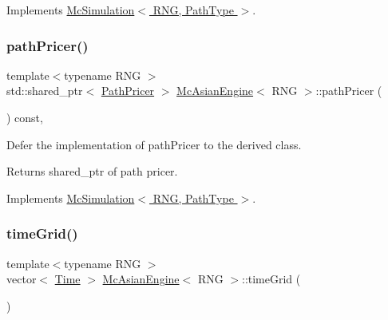 Implements \hyperlink{class_mc_simulation_afa7ba8d9b534837e7c62f47c6d20a353}{Mc\+Simulation$<$ R\+N\+G, Path\+Type $>$}.

\hypertarget{class_mc_asian_engine_a4ad8ccd05433f0668d751a8b3dcbb746}{}\label{class_mc_asian_engine_a4ad8ccd05433f0668d751a8b3dcbb746} 
\subsubsection{\texorpdfstring{path\+Pricer()}{pathPricer()}}
{\footnotesize\ttfamily template$<$typename R\+NG $>$ \\
std\+::shared\+\_\+ptr$<$ \hyperlink{class_path_pricer}{Path\+Pricer} $>$ \hyperlink{class_mc_asian_engine}{Mc\+Asian\+Engine}$<$ R\+NG $>$\+::path\+Pricer (\begin{DoxyParamCaption}{ }\end{DoxyParamCaption}) const\hspace{0.3cm}{\ttfamily [override]}, {\ttfamily [virtual]}}



Defer the implementation of path\+Pricer to the derived class. 

\begin{DoxyReturn}{Returns}
shared\+\_\+ptr of path pricer. 
\end{DoxyReturn}


Implements \hyperlink{class_mc_simulation_a64a3e635c1fa9d25797dc0cbad767238}{Mc\+Simulation$<$ R\+N\+G, Path\+Type $>$}.

\hypertarget{class_mc_asian_engine_ad8d2c8721172ab1d7327db91a26c5052}{}\label{class_mc_asian_engine_ad8d2c8721172ab1d7327db91a26c5052} 
\subsubsection{\texorpdfstring{time\+Grid()}{timeGrid()}}
{\footnotesize\ttfamily template$<$typename R\+NG $>$ \\
vector$<$ \hyperlink{_name_def_8h_ac2d3e0ba793497bcca555c7c2cf64ff3}{Time} $>$ \hyperlink{class_mc_asian_engine}{Mc\+Asian\+Engine}$<$ R\+NG $>$\+::time\+Grid (\begin{DoxyParamCaption}{ }\end{DoxyParamCaption})\hspace{0.3cm}{\ttfamily [override]}}



